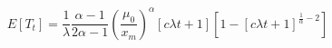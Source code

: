\documentclass{article}
\numberwithin{equation}{section}
\begin{document}
	
	$$E[T_t]=\frac{1}{\lambda }\frac{\alpha-1}{2\alpha-1} \left(\frac{\mu_0}{x_m}\right)^\alpha\left[c\lambda t+1\right]\left[1-\left[c\lambda t+1\right]^{\frac{1}{\alpha}-2} \right]$$
\end{document}

